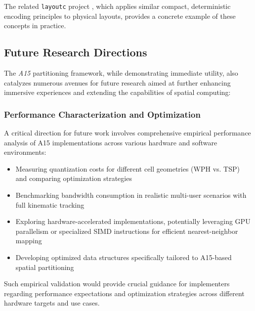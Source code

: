 \documentclass[10pt]{article}
\def\AAAB{\textit{A15}}
\begin{document}
The related \texttt{layoutc} project \cite{Risinger2024Layoutc}, which applies similar compact, deterministic encoding principles to physical layouts, provides a concrete example of these concepts in practice.

\subsection{Future Research Directions}\label{subsec-outlook-research}

The \AAAB{} partitioning framework, while demonstrating immediate utility, also catalyzes numerous avenues for future research aimed at further enhancing immersive experiences and extending the capabilities of spatial computing:

\subsubsection{Performance Characterization and Optimization}\label{subsubsec-outlook-performance}
A critical direction for future work involves comprehensive empirical performance analysis of A15 implementations across various hardware and software environments:
\begin{itemize} \itemsep0pt
    \item Measuring quantization costs for different cell geometries (WPH vs. TSP) and comparing optimization strategies
    \item Benchmarking bandwidth consumption in realistic multi-user scenarios with full kinematic tracking
    \item Exploring hardware-accelerated implementations, potentially leveraging GPU parallelism or specialized SIMD instructions for efficient nearest-neighbor mapping
    \item Developing optimized data structures specifically tailored to A15-based spatial partitioning
\end{itemize}
Such empirical validation would provide crucial guidance for implementers regarding performance expectations and optimization strategies across different hardware targets and use cases.
\end{document}
